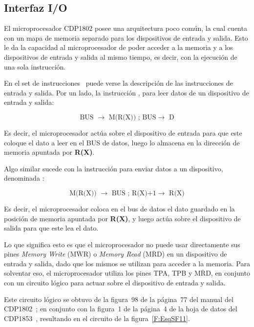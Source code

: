 \clearpage
\subsection{Interfaz I/O}
\label{C:I/O}

El microprocesador CDP1802 posee una arquitectura poco común, la cual cuenta con un mapa de memoria separado para los dispositivos de entrada y salida. Esto le da la capacidad al microprocesador de poder acceder a la memoria y a los dispositivos de entrada y salida al mismo tiempo, es decir, con la ejecución de una sola instrucción.

En el set de instrucciones~\cite{cdp1802_datasheet} puede verse la descripción de las instrucciones de entrada y salida. Por un lado, la instrucción , para leer datos de un dispositivo de entrada y salida:

\begin{equation*}
    \text{ BUS } \rightarrow \text{ M(R(X)) ; BUS} \rightarrow \text{ D }
\end{equation*}

Es decir, el microprocesador actúa sobre el dispositivo de entrada para que este coloque el dato a leer en el BUS de datos, luego lo almacena en la dirección de memoria apuntada por \textbf{R(X)}.

Algo similar sucede con la instrucción para enviar datos a un dispositivo, denominada :

\begin{equation*}
    \text{ M(R(X)) } \rightarrow \text{ BUS ; R(X)+1} \rightarrow \text{ R(X) }
\end{equation*}

Es decir, el microprocesador coloca en el bus de datos el dato guardado en la posición de memoria apuntada por \textbf{R(X)}, y luego actúa sobre el dispositivo de salida para que este lea el dato.

Lo que significa esto es que el microprocesador no puede usar directamente sus pines \textit{Memory Write} ($ \overline{\text{MWR}} $) o \textit{Memory Read} ($ \overline{\text{MRD}} $) en un dispositivo de entrada y salida, dado que los mismos se utilizan para acceder a la memoria. Para solventar eso, el microprocesador utiliza los pines TPA, TPB y $ \overline{\text{MRD}} $, en conjunto con un circuito lógico para actuar sobre el dispositivo de entrada y salida.

Este circuito lógico se obtuvo de la figura~98 de la página~77 del manual del CDP1802~\cite{cdp1802_manual}; en conjunto con la figura~1 de la página~4 de la hoja de datos del CDP1853~\cite{datasheet_CDP1853}, resultando en el circuito de la figura~\ref{F:EsqSF11}.


